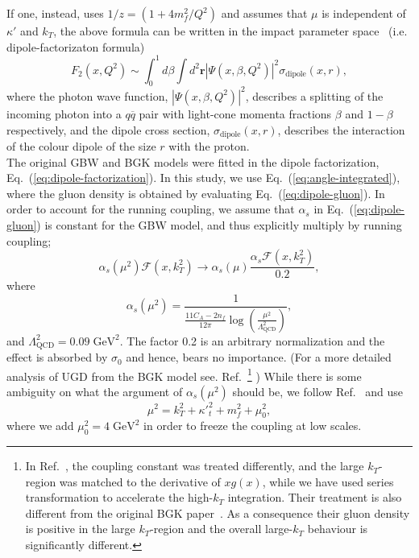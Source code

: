 \documentclass[12pt]{article}
\numberwithin{equation}{section}
\numberwithin{table}{section}
\numberwithin{figure}{section}
\newcommand{\GeV}[0]{\mathrm{GeV}}
\begin{document}
If one, instead, uses $ 1/z=\left(1+4 m_f^2/Q^2\right)$ and assumes that $\mu$ is independent of $\kappa'$ and $k_T$, 
the above formula can be written in the impact parameter space~\cite{Golec-Biernat:1998zce} (i.e. dipole-factorizaton formula)
\begin{equation}
F_2\left(x,Q^2\right)\sim\int^1_0d\beta \int d^2\mathbf{r}\left|\Psi\left(x,\beta,Q^2\right)\right|^2\sigma_{\mathrm{dipole}}\left(x,r\right),
\label{eq:dipole-factorization}
\end{equation}
where the photon wave function, $\left|\Psi\left(x,\beta,Q^2\right)\right|^2$, describes a splitting of the incoming photon into a $q\overline{q}$ pair with light-cone momenta fractions $\beta$ and $1-\beta$ respectively, and the dipole cross section, $\sigma_{\mathrm{dipole}}\left(x,r\right)$, describes the interaction of the colour dipole of the size $r$ with the proton.\\

The original GBW and BGK models were fitted in the dipole factorization, Eq.~(\ref{eq:dipole-factorization}). In this study, we use Eq.~(\ref{eq:angle-integrated}), where the gluon density is obtained by evaluating Eq.~(\ref{eq:dipole-gluon}).
In order to account for the running coupling, we assume that $\alpha_s$ in Eq.~(\ref{eq:dipole-gluon}) is constant for the GBW model, and thus explicitly multiply by running coupling;
\begin{equation}
\alpha_s(\mu^2)\mathcal{F}(x,k_T^2)\rightarrow \alpha_s(\mu)\frac{\alpha_s\mathcal{F}(x,k_T^2)}{0.2},
\end{equation}
where %
\begin{equation}
\alpha_s(\mu^2)=\frac{1}{\frac{11 C_A-2n_f}{12\pi}\log\left(\frac{\mu^2}{\Lambda_{\mathrm{QCD}}^2 }\right)},
\end{equation}
and  $\Lambda_{\mathrm{QCD}}^2=0.09\;\GeV^2$.
The factor 0.2 is an arbitrary normalization and the effect is absorbed by $\sigma_0$ and hence, bears no importance.
(For a more detailed analysis of UGD from the BGK model see. Ref.~\cite{Luszczak:2022fkf}\footnote{In Ref.~\cite{Luszczak:2022fkf}, the coupling constant was treated differently, and the large $k_T$-region was matched to the derivative of $xg(x)$, while we have used series transformation to accelerate the high-$k_T$ integration. Their treatment is also different from the original BGK paper~\cite{Bartels:2002cj}. As a consequence their gluon density is positive in the large $k_T$-region and the overall large-$k_T$ behaviour is significantly different.}
)
While there is some ambiguity on what the argument of $\alpha_s(\mu^2)$ should be, we follow Ref.~\cite{Kwiecinski:1997ee} and use
\begin{equation}
	\mu^2=k_T^2+{\kappa'}_t^2+m_f^2+\mu^2_0,
\end{equation}
where we add $\mu^2_0=4\;\GeV^2$ in order to freeze the coupling at low scales.
\end{document}
